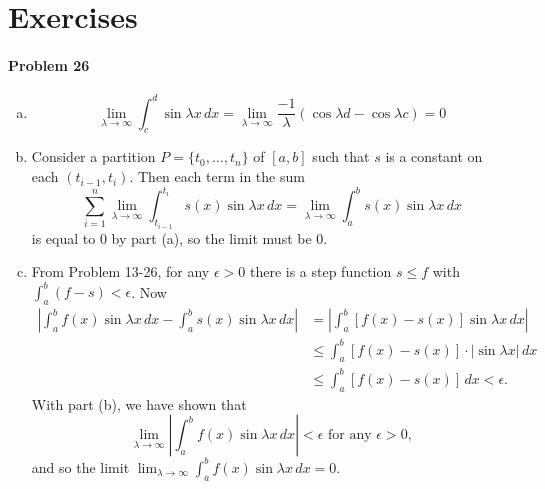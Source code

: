 \documentclass{article}
\begin{document}
\section*{Exercises}

\paragraph{Problem 26}
\begin{enumerate}[(a)]
  \item \[
      \lim_{\lambda \to \infty} \int_c^d \sin \lambda x \,dx
      = \lim_{\lambda \to \infty} \frac{-1}{\lambda}
      (\cos \lambda d - \cos \lambda c)
      = 0
    \]
  \item Consider a partition $P = \{t_0, \ldots, t_n\}$ of $[a, b]$ such that
    $s$ is a constant on each $(t_{i - 1}, t_i)$. Then each term in the sum \[
      \sum_{i=1}^n \lim_{\lambda \to \infty} \int_{t_{i-1}}^{t_i} s(x)
        \sin \lambda x
      \,dx = \lim_{\lambda \to \infty} \int_a^b
        s(x) \sin \lambda x
      \,dx
    \] is equal to 0 by part (a), so the limit must be 0.
  \item From Problem 13-26, for any $\epsilon > 0$ there is a step function $s
    \leq f$ with $\int_a^b (f - s) < \epsilon$. Now
    \begin{align*}
      \left|
        \int_a^b f(x) \sin \lambda x \,dx - \int_a^b s(x) \sin \lambda x \,dx
      \right|
      &= \left|
        \int_a^b [f(x) - s(x)] \sin \lambda x \,dx
      \right| \\
      &\leq \int_a^b [f(x) - s(x)] \cdot |\sin \lambda x| \,dx \\
      &\leq \int_a^b [f(x) - s(x)] \,dx < \epsilon.
    \end{align*}
    With part (b), we have shown that \[
      \lim_{\lambda \to \infty} \left| \int_a^b f(x)\sin \lambda x \,dx \right|
      < \epsilon \text{ for any } \epsilon > 0,
    \] and so the limit $\lim_{\lambda \to \infty} \int_a^b f(x)\sin \lambda x
    \,dx = 0$.
\end{enumerate}
\end{document}
